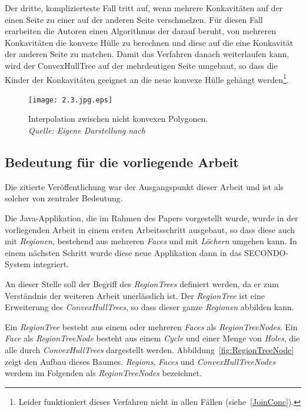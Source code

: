 Der dritte, komplizierteste Fall tritt auf, wenn mehrere Konkavitäten auf der einen Seite zu einer auf der anderen Seite verschmelzen. Für diesen Fall erarbeiten die Autoren einen Algorithmus der darauf beruht, von mehreren Konkavitäten die konvexe Hülle zu berechnen und diese auf die eine Konkavität der anderen Seite zu matchen. Damit das Verfahren danach weiterlaufen kann, wird der ConvexHullTree auf der mehrdeutigen Seite umgebaut, so dass die Kinder der Konkavitäten geeignet an die neue konvexe Hülle gehängt werden\footnote{Leider funktioniert dieses Verfahren nicht in allen Fällen (siehe~\vref{JoinConc}).}.

\begin{figure}
	\centering
	\texttt{[image: 2.3.jpg.eps]}
	\caption[Interpolation zwischen nicht konvexen Polygonen]{Interpolation zwischen nicht konvexen Polygonen.\\\textit{Quelle: Eigene Darstellung nach \cite{TG}}}
	\label{fig:Interpolationnonconvex}
\end{figure}

\subsection{Bedeutung für die vorliegende Arbeit}

Die zitierte Veröffentlichung war der Ausgangspunkt dieser Arbeit und ist als solcher von zentraler Bedeutung.

Die Java-Applikation, die im Rahmen des Papers vorgestellt wurde, wurde in der vorliegenden Arbeit in einem ersten Arbeitsschritt ausgebaut, so dass diese auch mit \textit{Regionen}, bestehend aus mehreren \textit{Faces} und mit \textit{Löchern} umgehen kann. In einem nächsten Schritt wurde diese neue Applikation dann in das SECONDO-System integriert.

An dieser Stelle soll der Begriff des \textit{RegionTrees} definiert werden, da er zum Verständnis der weiteren Arbeit unerlässlich ist. Der \textit{RegionTree} ist eine Erweiterung des \textit{ConvexHullTrees}, so dass dieser ganze \textit{Regionen} abbilden kann. 

Ein \textit{RegionTree} besteht aus einem oder mehreren \textit{Faces} als \textit{RegionTreeNodes}. Ein \textit{Face} als \textit{RegionTreeNode} besteht aus einem \textit{Cycle} und einer Menge von \textit{Holes}, die alle durch \textit{ConvexHullTrees} dargestellt werden. Abbildung~\vref{fig:RegionTreeNode} zeigt den Aufbau dieses Baumes. \textit{Regions}, \textit{Faces} und \textit{ConvexHullTreeNodes} werdem im Folgenden als \textit{RegionTreeNodes} bezeichnet.


